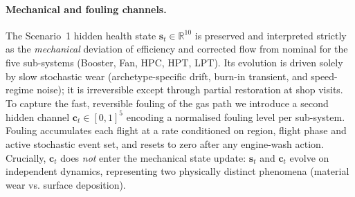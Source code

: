 \paragraph{Mechanical and fouling channels.}
The Scenario~1 hidden health state $\mathbf{s}_t \in \mathbb{R}^{10}$
is preserved and interpreted strictly as the \emph{mechanical} deviation
of efficiency and corrected flow from nominal for the five sub-systems
(Booster, Fan, HPC, HPT, LPT). Its evolution is driven solely by slow
stochastic wear (archetype-specific drift, burn-in transient, and
speed-regime noise); it is irreversible except through partial
restoration at shop visits. To capture the fast, reversible fouling
of the gas path we introduce a second hidden channel
$\mathbf{c}_t \in [0,1]^5$ encoding a normalised fouling level
per sub-system. Fouling accumulates each flight at a rate
conditioned on region, flight phase and active stochastic event set,
and resets to zero after any engine-wash action. Crucially, $\mathbf{c}_t$
does \emph{not} enter the mechanical state update: $\mathbf{s}_t$ and
$\mathbf{c}_t$ evolve on independent dynamics, representing two
physically distinct phenomena (material wear vs. surface deposition).


